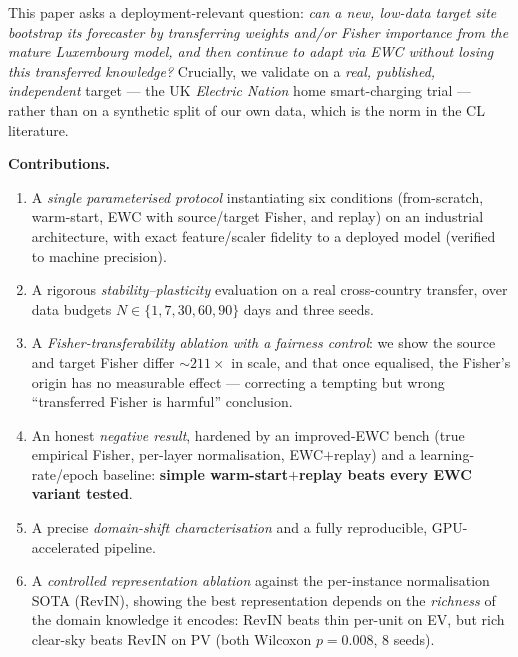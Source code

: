 \documentclass[conference]{IEEEtran}
\begin{document}
This paper asks a deployment-relevant question: \emph{can a new, low-data target
site bootstrap its forecaster by transferring weights and/or Fisher importance
from the mature Luxembourg model, and then continue to adapt via EWC without
losing this transferred knowledge?} Crucially, we validate on a \emph{real,
published, independent} target --- the UK \emph{Electric Nation} home
smart-charging trial --- rather than on a synthetic split of our own data, which
is the norm in the CL literature.

\noindent\textbf{Contributions.}
\begin{enumerate}
\item A \emph{single parameterised protocol} instantiating six conditions
(from-scratch, warm-start, EWC with source/target Fisher, and replay) on an
industrial architecture, with exact feature/scaler fidelity to a deployed model
(verified to machine precision).
\item A rigorous \emph{stability--plasticity} evaluation on a real cross-country
transfer, over data budgets $N\!\in\!\{1,7,30,60,90\}$ days and three seeds.
\item A \emph{Fisher-transferability ablation with a fairness control}: we show
the source and target Fisher differ ${\sim}211\times$ in scale, and that once
equalised, the Fisher's origin has no measurable effect --- correcting a
tempting but wrong ``transferred Fisher is harmful'' conclusion.
\item An honest \emph{negative result}, hardened by an improved-EWC bench (true
empirical Fisher, per-layer normalisation, EWC$+$replay) and a learning-rate/epoch
baseline: \textbf{simple warm-start$+$replay beats every EWC variant tested}.
\item A precise \emph{domain-shift characterisation} and a fully reproducible,
GPU-accelerated pipeline.
\item A \emph{controlled representation ablation} against the per-instance
normalisation SOTA (RevIN), showing the best representation depends on the
\emph{richness} of the domain knowledge it encodes: RevIN beats thin per-unit on
EV, but rich clear-sky beats RevIN on PV (both Wilcoxon $p{=}0.008$, $8$ seeds).
\end{enumerate}

\end{document}
